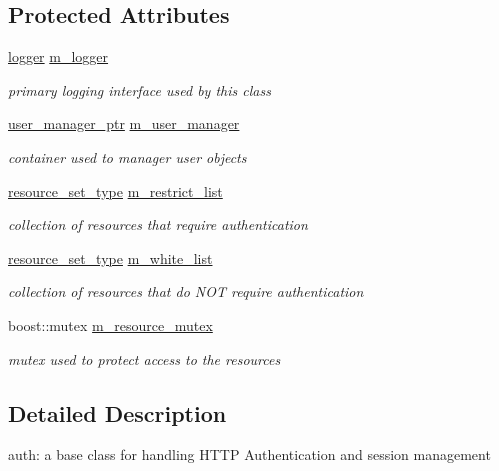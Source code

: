 \subsection*{Protected Attributes}
\begin{DoxyCompactItemize}
\item 
\hyperlink{structpion_1_1logger}{logger} \hyperlink{classpion_1_1http_1_1auth_a936282ab441711ea3c5e52eab6ac9948}{m\-\_\-logger}
\begin{DoxyCompactList}\small\item\em primary logging interface used by this class \end{DoxyCompactList}\item 
\hyperlink{namespacepion_a20602680730b88b8efd08b3730d601af}{user\-\_\-manager\-\_\-ptr} \hyperlink{classpion_1_1http_1_1auth_a5f85a718dc74306a6f62c931d2b4bc53}{m\-\_\-user\-\_\-manager}
\begin{DoxyCompactList}\small\item\em container used to manager user objects \end{DoxyCompactList}\item 
\hyperlink{classpion_1_1http_1_1auth_afba7081a3795e3010f0051e4e85a38e3}{resource\-\_\-set\-\_\-type} \hyperlink{classpion_1_1http_1_1auth_a39970188567b9719e779dfe9ec0c901b}{m\-\_\-restrict\-\_\-list}
\begin{DoxyCompactList}\small\item\em collection of resources that require authentication \end{DoxyCompactList}\item 
\hyperlink{classpion_1_1http_1_1auth_afba7081a3795e3010f0051e4e85a38e3}{resource\-\_\-set\-\_\-type} \hyperlink{classpion_1_1http_1_1auth_a7c65c43c168549ae65ce443c10a9021a}{m\-\_\-white\-\_\-list}
\begin{DoxyCompactList}\small\item\em collection of resources that do N\-O\-T require authentication \end{DoxyCompactList}\item 
boost\-::mutex \hyperlink{classpion_1_1http_1_1auth_a5c1e57d2531c833a747ebbf9f3efe213}{m\-\_\-resource\-\_\-mutex}
\begin{DoxyCompactList}\small\item\em mutex used to protect access to the resources \end{DoxyCompactList}\end{DoxyCompactItemize}


\subsection{Detailed Description}
auth\-: a base class for handling H\-T\-T\-P Authentication and session management 

